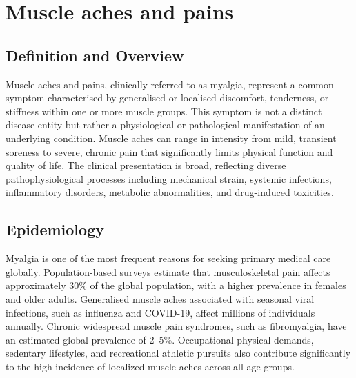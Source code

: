 \chapter{Muscle aches and pains}

\section*{Definition and Overview}
Muscle aches and pains, clinically referred to as myalgia, represent a common symptom characterised by generalised or localised discomfort, tenderness, or stiffness within one or more muscle groups. This symptom is not a distinct disease entity but rather a physiological or pathological manifestation of an underlying condition. Muscle aches can range in intensity from mild, transient soreness to severe, chronic pain that significantly limits physical function and quality of life. The clinical presentation is broad, reflecting diverse pathophysiological processes including mechanical strain, systemic infections, inflammatory disorders, metabolic abnormalities, and drug-induced toxicities.

\section*{Epidemiology}
Myalgia is one of the most frequent reasons for seeking primary medical care globally. Population-based surveys estimate that musculoskeletal pain affects approximately 30\% of the global population, with a higher prevalence in females and older adults. Generalised muscle aches associated with seasonal viral infections, such as influenza and COVID-19, affect millions of individuals annually. Chronic widespread muscle pain syndromes, such as fibromyalgia, have an estimated global prevalence of 2--5\%. Occupational physical demands, sedentary lifestyles, and recreational athletic pursuits also contribute significantly to the high incidence of localized muscle aches across all age groups.

